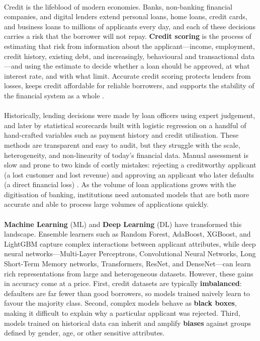 \documentclass[12pt,a4paper,final]{extreport}
\begin{document}
\paragraph{} Credit is the lifeblood of modern economies. Banks, non-banking financial companies, and digital lenders extend personal loans, home loans, credit cards, and business loans to millions of applicants every day, and each of these decisions carries a risk that the borrower will not repay. \textbf{Credit scoring} is the process of estimating that risk from information about the applicant---income, employment, credit history, existing debt, and increasingly, behavioural and transactional data---and using the estimate to decide whether a loan should be approved, at what interest rate, and with what limit. Accurate credit scoring protects lenders from losses, keeps credit affordable for reliable borrowers, and supports the stability of the financial system as a whole \cite{p1}.

\paragraph{} Historically, lending decisions were made by loan officers using expert judgement, and later by statistical scorecards built with logistic regression on a handful of hand-crafted variables such as payment history and credit utilisation. These methods are transparent and easy to audit, but they struggle with the scale, heterogeneity, and non-linearity of today's financial data. Manual assessment is slow and prone to two kinds of costly mistakes: rejecting a creditworthy applicant (a lost customer and lost revenue) and approving an applicant who later defaults (a direct financial loss) \cite{p2}. As the volume of loan applications grows with the digitisation of banking, institutions need automated models that are both more accurate and able to process large volumes of applications quickly.

\paragraph{} \textbf{Machine Learning} (ML) and \textbf{Deep Learning} (DL) have transformed this landscape. Ensemble learners such as Random Forest, AdaBoost, XGBoost, and LightGBM capture complex interactions between applicant attributes, while deep neural networks---Multi-Layer Perceptrons, Convolutional Neural Networks, Long Short-Term Memory networks, Transformers, ResNet, and DenseNet---can learn rich representations from large and heterogeneous datasets. However, these gains in accuracy come at a price. First, credit datasets are typically \textbf{imbalanced}: defaulters are far fewer than good borrowers, so models trained naively learn to favour the majority class. Second, complex models behave as \textbf{black boxes}, making it difficult to explain why a particular applicant was rejected. Third, models trained on historical data can inherit and amplify \textbf{biases} against groups defined by gender, age, or other sensitive attributes.
\end{document}
